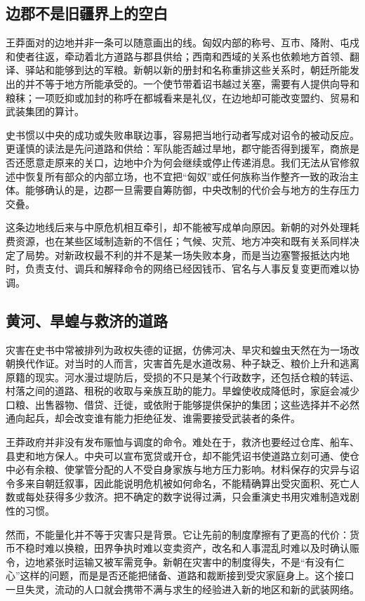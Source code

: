 \subsection{边郡不是旧疆界上的空白}

王莽面对的边地并非一条可以随意画出的线。匈奴内部的称号、互市、降附、屯戍和使者往返，牵动着北方道路与郡县供给；西南和西域的关系也依赖地方首领、翻译、驿站和能够到达的军粮。新朝以新的册封和名称重排这些关系时，朝廷所能发出的并不等于地方所能承受的。一个使节带着诏书越过关塞，需要有人提供向导和粮秣；一项贬抑或加封的称呼在都城看来是礼仪，在边地却可能改变盟约、贸易和武装集团的算计。

史书惯以中央的成功或失败串联边事，容易把当地行动者写成对诏令的被动反应。更谨慎的读法是先问道路和供给：军队能否越过旱地，郡守能否得到援军，商旅是否还愿意走原来的关口，边地中介为何会继续或停止传递消息。我们无法从官修叙述中恢复所有部众的内部立场，也不宜把“匈奴”或任何族称当作整齐一致的政治主体。能够确认的是，边郡一旦需要自筹防御，中央改制的代价会与地方的生存压力交叠。

这条边地线后来与中原危机相互牵引，却不能被写成单向原因。新朝的对外处理耗费资源，也在某些区域制造新的不信任；气候、灾荒、地方冲突和既有关系同样决定了局势。对新政权最不利的并不是某一场失败本身，而是当边塞警报抵达内地时，负责支付、调兵和解释命令的网络已经因钱币、官名与人事反复变更而难以协调。

\subsection{黄河、旱蝗与救济的道路}

灾害在史书中常被排列为政权失德的证据，仿佛河决、旱灾和蝗虫天然在为一场改朝换代作证。对当时的人而言，灾害首先是水道改易、种子缺乏、粮价上升和逃离原籍的现实。河水漫过堤防后，受损的不只是某个行政数字，还包括仓粮的转运、村落之间的道路、租税的收取与亲族互助的能力。旱蝗使收成降低时，家庭会减少口粮、出售器物、借贷、迁徙，或依附于能够提供保护的集团；这些选择并不必然通向起兵，却会改变谁有能力拒绝征发、谁需要接受武装者的条件。

王莽政府并非没有发布赈恤与调度的命令。难处在于，救济也要经过仓库、船车、县吏和地方保人。中央可以宣布宽贷或开仓，却不能凭诏书使道路立刻可通、使仓中必有余粮、使掌管分配的人不受自身家族与地方压力影响。材料保存的灾异与诏令多来自朝廷叙事，因此能说明危机被如何命名，不能精确算出受灾面积、死亡人数或每处获得多少救济。把不确定的数字说得过满，只会重演史书用灾难制造戏剧性的习惯。

然而，不能量化并不等于灾害只是背景。它让先前的制度摩擦有了更高的代价：货币不稳时难以换粮，田界争执时难以变卖资产，改名和人事混乱时难以及时确认赈令，边地紧张时运输又被军需竞争。新朝在灾害中的制度得失，不是“有没有仁心”这样的问题，而是是否还能把储备、道路和裁断接到受灾家庭身上。这个接口一旦失灵，流动的人口就会携带不满与求生的经验进入新的地区和新的武装网络。

